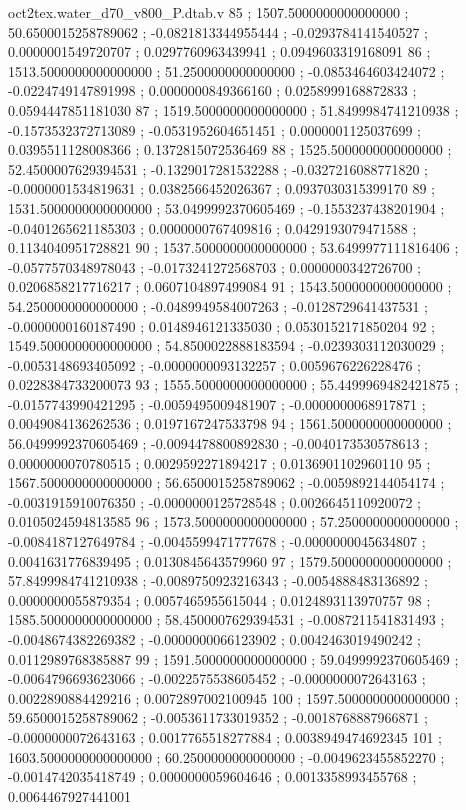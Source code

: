 \begin{filecontents}[overwrite]{oct2tex.water_d70_v800_P.dtab.v}
85 ; 1507.5000000000000000 ; 50.6500015258789062 ; -0.0821813344955444 ; -0.0293784141540527 ; 0.0000001549720707 ; 0.0297760963439941 ; 0.0949603319168091
86 ; 1513.5000000000000000 ; 51.2500000000000000 ; -0.0853464603424072 ; -0.0224749147891998 ; 0.0000000849366160 ; 0.0258999168872833 ; 0.0594447851181030
87 ; 1519.5000000000000000 ; 51.8499984741210938 ; -0.1573532372713089 ; -0.0531952604651451 ; 0.0000001125037699 ; 0.0395511128008366 ; 0.1372815072536469
88 ; 1525.5000000000000000 ; 52.4500007629394531 ; -0.1329017281532288 ; -0.0327216088771820 ; -0.0000001534819631 ; 0.0382566452026367 ; 0.0937030315399170
89 ; 1531.5000000000000000 ; 53.0499992370605469 ; -0.1553237438201904 ; -0.0401265621185303 ; 0.0000000767409816 ; 0.0429193079471588 ; 0.1134040951728821
90 ; 1537.5000000000000000 ; 53.6499977111816406 ; -0.0577570348978043 ; -0.0173241272568703 ; 0.0000000342726700 ; 0.0206858217716217 ; 0.0607104897499084
91 ; 1543.5000000000000000 ; 54.2500000000000000 ; -0.0489949584007263 ; -0.0128729641437531 ; -0.0000000160187490 ; 0.0148946121335030 ; 0.0530152171850204
92 ; 1549.5000000000000000 ; 54.8500022888183594 ; -0.0239303112030029 ; -0.0053148693405092 ; -0.0000000093132257 ; 0.0059676226228476 ; 0.0228384733200073
93 ; 1555.5000000000000000 ; 55.4499969482421875 ; -0.0157743990421295 ; -0.0059495009481907 ; -0.0000000068917871 ; 0.0049084136262536 ; 0.0197167247533798
94 ; 1561.5000000000000000 ; 56.0499992370605469 ; -0.0094478800892830 ; -0.0040173530578613 ; 0.0000000070780515 ; 0.0029592271894217 ; 0.0136901102960110
95 ; 1567.5000000000000000 ; 56.6500015258789062 ; -0.0059892144054174 ; -0.0031915910076350 ; -0.0000000125728548 ; 0.0026645110920072 ; 0.0105024594813585
96 ; 1573.5000000000000000 ; 57.2500000000000000 ; -0.0084187127649784 ; -0.0045599471777678 ; -0.0000000045634807 ; 0.0041631776839495 ; 0.0130845643579960
97 ; 1579.5000000000000000 ; 57.8499984741210938 ; -0.0089750923216343 ; -0.0054888483136892 ; 0.0000000055879354 ; 0.0057465955615044 ; 0.0124893113970757
98 ; 1585.5000000000000000 ; 58.4500007629394531 ; -0.0087211541831493 ; -0.0048674382269382 ; -0.0000000066123902 ; 0.0042463019490242 ; 0.0112989768385887
99 ; 1591.5000000000000000 ; 59.0499992370605469 ; -0.0064796693623066 ; -0.0022575538605452 ; -0.0000000072643163 ; 0.0022890884429216 ; 0.0072897002100945
100 ; 1597.5000000000000000 ; 59.6500015258789062 ; -0.0053611733019352 ; -0.0018768887966871 ; -0.0000000072643163 ; 0.0017765518277884 ; 0.0038949474692345
101 ; 1603.5000000000000000 ; 60.2500000000000000 ; -0.0049623455852270 ; -0.0014742035418749 ; 0.0000000059604646 ; 0.0013358993455768 ; 0.0064467927441001

\end{filecontents}

